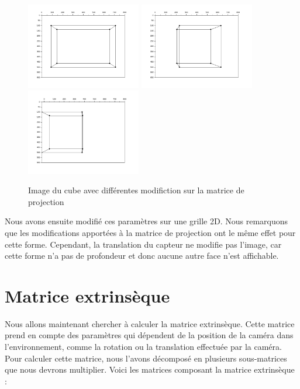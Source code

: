 \documentclass[a4paper,11pt]{article}
\begin{document}
  \begin{figure}[H]
    \center
    \includegraphics[width=5cm]{ProjectionTaille.png}
    \includegraphics[width=5cm]{ProjectionRotation.png}
    \includegraphics[width=5cm]{ProjectionTranslation.png}
    \caption{Image du cube avec différentes modifiction sur la matrice de projection}
  \end{figure}
  
  Nous avons ensuite modifié ces paramètres sur une grille 2D. Nous remarquons que les modifications apportées à la 
  matrice de projection ont le même effet pour cette forme.
  Cependant, la translation du capteur ne modifie pas l'image, car cette forme n'a pas de profondeur et donc aucune autre face n'est affichable.
  
  \section{Matrice extrinsèque}
  
  Nous allons maintenant chercher à calculer la matrice extrinsèque. Cette matrice prend en compte des paramètres qui dépendent de la position 
  de la caméra dans l'environnement, comme la rotation ou la translation effectuée par la caméra. Pour calculer cette matrice, nous l'avons 
  décomposé en plusieurs sous-matrices que nous devrons multiplier. Voici les matrices composant la matrice extrinsèque :\\
  
\end{document}
